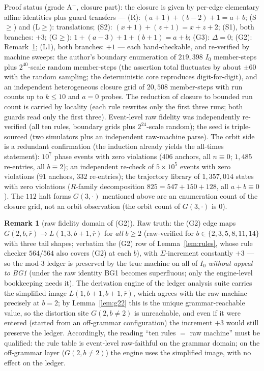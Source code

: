 \documentclass[11pt]{amsart}
\theoremstyle{definition}
\newtheorem{remark}[theorem]{Remark}
\begin{document}
Proof status (grade A$^-$, closure part): the closure is given by per-edge
elementary affine identities plus guard transfers --- (R):
$(a{+}1)+(b{-}2)+1=a+b$; (S$\ge$) and (L$\ge$): translations; (S2):
$(x{+}1)+(z{+}1)=x{+}z{+}2$; (S1), both branches: $+3$; (G$\ge$):
$1+(a{-}3)+1+(b{+}1)=a+b$; (G3): $\Delta=0$; (G2): Remark~\ref{rem:g2};
(L1), both branches: $+1$ --- each hand-checkable, and re-verified by machine
sweeps: the author's boundary enumeration of $219{,}398$ $I_0$ member-steps
plus $2^{40}$-scale random member-steps (the assertion total fluctuates by
about $\pm60$ with the random sampling; the deterministic core reproduces
digit-for-digit), and an independent heterogeneous closure grid of $20{,}508$
member-steps with run counts up to $k\le10$ and $a=0$ probes. The reduction
of closure to bounded run count is carried by locality (each rule rewrites
only the first three runs; both guards read only the first three).
Event-level raw fidelity was independently re-verified (all ten rules,
boundary grids plus $2^{24}$-scale random); the seed is triple-sourced (two
simulators plus an independent raw-machine parse). The orbit side is a
redundant confirmation (the induction already yields the all-times
statement): $10^{7}$ phase events with zero violations ($406$ anchors, all
$n\equiv0$; $1{,}485$ re-entries, all $b\equiv2$); an independent re-check of
$5\times10^{5}$ events with zero violations ($91$ anchors, $332$ re-entries);
the trajectory library of $1{,}357{,}014$ states with zero violations
($R$-family decomposition $825=547+150+128$, all $a+b\equiv0$). The $112$
halt forms $G(3,\cdot)$ mentioned above are an enumeration count of the
closure grid, not an orbit observation (the orbit count of $G(3,\cdot)$ is
$0$).

\begin{remark}[raw fidelity domain of (G2)]\label{rem:g2}
Raw truth: the (G2) edge maps $G(2,b,\overline r)\to L(1,3,b{+}1,\overline
r)$ for \emph{all} $b\ge2$ (raw-verified for $b\in\{2,3,5,8,11,14\}$ with
three tail shapes; verbatim the (G2) row of Lemma~\ref{lem:rules}, whose
rule checker $564/564$ also covers (G2) at each $b$), with $\Sigma$-increment
constantly $+3$ --- so the mod-3 ledger is preserved by the true machine on
all of $I_0$ \emph{without appeal to BG1} (under the raw identity BG1 becomes
superfluous; only the engine-level bookkeeping needs it). The derivation
engine of the ledger analysis suite carries the simplified image
$L(1,b{+}1,b{+}1,\overline r)$, which agrees with the raw machine precisely
at $b=2$; by Lemma~\ref{lem:g22} this is the unique grammar-reachable value,
so the distortion site $G(2,b\neq2)$ is unreachable, and even if it were
entered (started from an off-grammar configuration) the increment $+3$ would
still preserve the ledger. Accordingly, the reading ``ten rules $=$ raw
machine'' must be qualified: the rule table is event-level raw-faithful on
the grammar domain; on the off-grammar layer ($G(2,b\neq2)$) the engine uses
the simplified image, with no effect on the ledger.
\end{remark}
\end{document}
